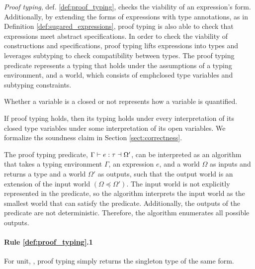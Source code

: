 \documentclass[acmsmall]{acmart}
\theoremstyle{definition}
\begin{document}
\emph{Proof typing}, def. \ref{def:proof_typing}, checks the viability of an expression's
form. Additionally, by extending the forms of expressions with type annotations, 
as in Definition \ref{def:sugared_expressions},
proof typing is also able to check that expressions meet abstract specifications.
In order to check the viability of constructions and specifications, 
proof typing lifts expressions into types and leverages subtyping to 
check compatibility between types. 
The proof typing predicate represents a typing that holds under the assumptions
of a typing environment, and a world, 
which consists of emph{closed} type variables and subtyping constraints. 

Whether a variable is a closed or not represents how a variable is quantified.

If proof typing holds, then its typing holds under every interpretation of its closed type variables
under some interpretation of its open variables.
We formalize ths soundness claim in Section \ref{sect:correctness}. 

The proof typing predicate, $\Gamma \vdash e : \tau \dashv \Omega'$, can 
be interpreted as an algorithm that takes a typing environment $\Gamma$, an expression $e$,
and a world $\Omega$ as inputs and returns a type and a world $\Omega'$ as outputs,
such that the output world is an extension of the input world $(\Omega \preceq \Omega')$.
The input world is not explicitly represented in the predicate, so the algorithm
interprets the input world as the smallest world that can satisfy the predicate. 
Additionally, the outputs of the predicate are not deterministic. Therefore, the algorithm
enumerates all possible outputs.



\paragraph{Rule \ref{def:proof_typing}.1}
For unit, , proof typing simply returns the singleton type of the same
form. 
\end{document}
